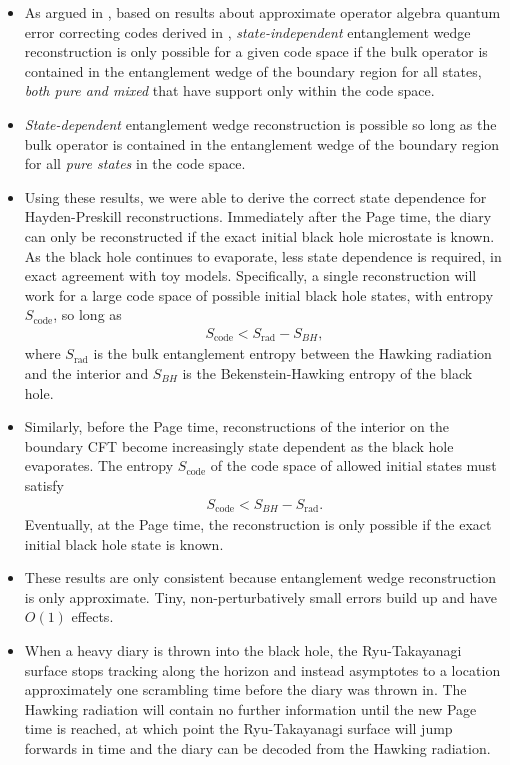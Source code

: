 \documentclass[12pt]{article}
\newcommand{\Srad}{S_\text{rad} }
\begin{document}
\begin{itemize}
\item As argued in \cite{hayden2018learning}, based on results about approximate operator algebra quantum error correcting codes derived in \cite{beny2007generalization, beny2009conditions, beny2010general}, \emph{state-independent} entanglement wedge reconstruction is only possible for a given code space if the bulk operator is contained in the entanglement wedge of the boundary region for all states, \emph{both pure and mixed} that have support only within the code space.

\item \emph{State-dependent} entanglement wedge reconstruction is possible so long as the bulk operator is contained in the entanglement wedge of the boundary region for all \emph{pure states} in the code space.

\item Using these results, we were able to derive the correct state dependence for Hayden-Preskill reconstructions. Immediately after the Page time, the diary can only be reconstructed if the exact initial black hole microstate is known. As the black hole continues to evaporate, less state dependence is required, in exact agreement with toy models. Specifically, a single reconstruction will work for a large code space of possible initial black hole states, with entropy $S_\text{code}$, so long as
\begin{align}
S_\text{code} < \Srad - S_{BH},
\end{align}
where $\Srad$ is the bulk entanglement entropy between the Hawking radiation and the interior and $S_{BH}$ is the Bekenstein-Hawking entropy of the black hole.

\item Similarly, before the Page time, reconstructions of the interior on the boundary CFT become increasingly state dependent as the black hole evaporates. The entropy $S_\text{code}$ of the code space of allowed initial states must satisfy
\begin{align}
S_\text{code} < S_{BH} - \Srad.
\end{align}
Eventually, at the Page time, the reconstruction is only possible if the exact initial black hole state is known.

\item These results are only consistent because entanglement wedge reconstruction is only approximate. Tiny, non-perturbatively small errors build up and have $O(1)$ effects.

\item When a heavy diary is thrown into the black hole, the Ryu-Takayanagi surface stops tracking along the horizon and instead asymptotes to a location approximately one scrambling time before the diary was thrown in. The Hawking radiation will contain no further information until the new Page time is reached, at which point the Ryu-Takayanagi surface will jump forwards in time and the diary can be decoded from the Hawking radiation. 


\end{itemize}
\end{document}
